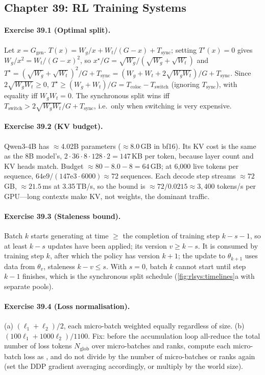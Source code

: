 \subsection*{Chapter 39: RL Training Systems}

\paragraph{Exercise 39.1 (Optimal split).}
Let $x=G_{\text{gen}}$. $T(x)=W_g/x+W_t/(G-x)+T_{\text{sync}}$; setting $T'(x)=0$ gives
$W_g/x^2=W_t/(G-x)^2$, so $x^\star/G=\sqrt{W_g}/(\sqrt{W_g}+\sqrt{W_t})$ and
$T^\star=(\sqrt{W_g}+\sqrt{W_t})^2/G+T_{\text{sync}}=(W_g+W_t+2\sqrt{W_gW_t})/G+T_{\text{sync}}$.
Since $2\sqrt{W_gW_t}\ge0$, $T^\star\ge (W_g+W_t)/G=T_{\text{coloc}}-T_{\text{switch}}$ (ignoring
$T_{\text{sync}}$), with equality iff $W_gW_t=0$. The synchronous split wins iff
$T_{\text{switch}}>2\sqrt{W_gW_t}/G+T_{\text{sync}}$, i.e.\ only when switching is very expensive.

\paragraph{Exercise 39.2 (KV budget).}
Qwen3-4B has $\approx$4.02B parameters ($\approx$8.0\,GB in bf16). Its KV cost is the same as the 8B
model's, $2\cdot36\cdot8\cdot128\cdot2=147$\,KB per token, because layer count and KV heads match.
Budget $\approx 80-8.0-8=64$\,GB; at 6{,}000 live tokens per sequence, $64\text{e}9/(147\text{e}3\cdot
6000)\approx 72$ sequences. Each decode step streams $\approx72$\,GB, $\approx21.5$\,ms at 3.35\,TB/s,
so the bound is $\approx 72/0.0215\approx 3{,}400$ tokens/s per GPU---long contexts make KV, not
weights, the dominant traffic.

\paragraph{Exercise 39.3 (Staleness bound).}
Batch $k$ starts generating at time $\ge$ the completion of training step $k-s-1$, so at least
$k-s$ updates have been applied; its version $v\ge k-s$. It is consumed by training step $k$,
after which the policy has version $k+1$; the update to $\theta_{k+1}$ uses data from $\theta_v$,
staleness $k-v\le s$. With $s=0$, batch $k$ cannot start until step $k-1$ finishes, which is the
synchronous split schedule (\cref{fig:rlsys:timelines}a with separate pools).

\paragraph{Exercise 39.4 (Loss normalisation).}
(a) $(\ell_1+\ell_2)/2$, each micro-batch weighted equally regardless of size. (b)
$(100\ell_1+1000\ell_2)/1100$. Fix: before the accumulation loop all-reduce the total number of
loss tokens $N_{\text{glob}}$ over micro-batches and ranks, compute each micro-batch loss as
, and do not divide by the number of micro-batches or
ranks again (set the DDP gradient averaging accordingly, or multiply by the world size).

